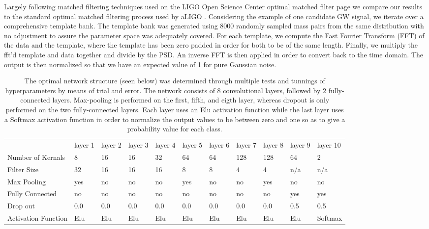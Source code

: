 \documentclass[%
 amsmath,amssymb,
 aps,
 twocolumn,
 prl,
 reprint,
floatfix,
]{revtex4-1}
\begin{document}
Largely following matched filtering techniques used on the LIGO Open Science Center optimal matched filter page \cite{1742-6596-610-1-012021} we compare our results to the standard optimal matched filtering process used by aLIGO \cite{PhysRevD.85.122006}. Considering the example of one candidate GW signal, we iterate over a comprehensive template bank. The template bank was generated using 8000 randomly sampled mass pairs from the same distribution with no adjustment to assure the parameter space was adequately covered. For each template, we compute the Fast Fourier Transform (FFT) of the data and the template, where the template has been zero padded in order for both to be of the same length. Finally, we multiply the fft'd template and data together and divide by the PSD. An inverse FFT is then applied in order to convert back to the time domain. The output is then normalized so that we have an expected value of 1 for pure Gaussian noise.

\begin{table}[]
\centering
\caption{The optimal network structure (seen below) was determined through multiple tests and tunnings of hyperparameters by means of trial and error. The network consists of 8 convolutional layers, followed by 2 fully-connected layers. Max-pooling is performed on the first, fifth, and eigth layer, whereas dropout is only performed on the two fully-connected layers. Each layer uses an Elu activation function while the last layer uses a Softmax activation function in order to normalize the output values to be between zero and one so as to give a probability value for each class. \\} 
\label{table:network}
\begin{tabular}{lllllllllll}
                    & layer 1 & layer 2 & layer 3 & layer 4 & layer 5 & layer 6 & layer 7 & layer 8 & layer 9 & layer 10 \\
Number of Kernals   & 8       & 16      & 16      & 32      & 64      & 64      & 128     & 128     & 64      & 2        \\
Filter Size         & 32      & 16      & 16      & 16      & 8       & 8       & 4       & 4       & n/a     & n/a      \\
Max Pooling         & yes       & no       & no       & no       & yes       & no       & no       & yes       & no     & no      \\
Fully Connected     & no     & no     & no     & no     & no     & no     & no     & no     & yes     & yes      \\
Drop out            & 0.0     & 0.0     & 0.0     & 0.0     & 0.0     & 0.0     & 0.0     & 0.0     & 0.5     & 0.5      \\
Activation Function & Elu     & Elu     & Elu     & Elu     & Elu     & Elu     & Elu     & Elu     & Elu     & Softmax 
\end{tabular}
\end{table}
\end{document}
